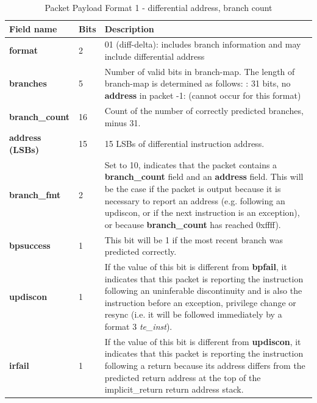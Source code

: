 \begin{table}[htp]
  \centering
  \caption{Packet Payload Format 1 - differential address, branch count}
  \label{tab:te_inst0-1-addr-count}
  \begin{tabulary}{\textwidth}{|l|p{35mm}|p{80mm}|}
    \hline
    {\bf Field name} & {\bf Bits} & {\bf Description} \\
    \hline
    \textbf{format}	& 2	& 01 (diff-delta): includes branch information and may include differential address\\
    \hline
    \textbf{branches} & 5 & Number of valid bits in branch-map. The length of branch-map is determined as follows: :      31 bits, no \textbf{address} in packet -1: 	(cannot occur for this format) \\
    \hline
    \textbf{branch\_count} & 16 & Count of the number of correctly predicted branches, minus 31. \\
    \hline
    \textbf{address (LSBs)}	& 15 & 
                15 LSBs of differential instruction address.\\
    \textbf{branch\_fmt} & 2 & Set to 10, indicates that the packet contains a \textbf{branch\_count} field and
     an \textbf{address} field. This will be the case if the packet is output because it is necessary to report an
     address (e.g. following an updiscon, or if the next instruction is an exception), or because \textbf{branch\_count} 
     has reached 0xffff).\\
    \hline
    \textbf{bpsuccess} & 1 & This bit will be 1 if the most recent branch was predicted correctly. \\
    \hline
    \textbf{updiscon}	& 1 & 
                If the value of this bit is different from \textbf{bpfail}, it indicates that this 
                packet is reporting the instruction following an uninferable discontinuity and is also the 
                instruction before an exception, privilege change or resync 
                (i.e. it will be followed immediately by a format 3 \textit{te\_inst}).\\
    \hline
    \textbf{irfail}	& 1 & 
                If the value of this bit is different from \textbf{updiscon}, it indicates that this
                packet is reporting the instruction following a return because its address differs from 
                the predicted return address at the top of the implicit\_return return address stack.\\

\end{tabulary}
\end{table}
